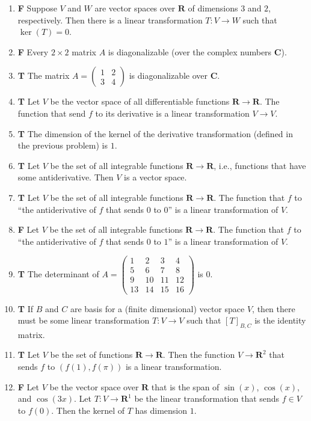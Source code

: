 \documentclass[10pt]{article}
\newcommand{\tf}[2]{\item {\bf {\color{blue}\hspace{1em}#1}}\hspace{1em} #2}
\newcommand{\R}{\mathbf{R}}
\newcommand{\C}{\mathbf{C}}
\begin{document}
\begin{enumerate}
\tf{F}{Suppose $V$ and $W$ are vector spaces over $\R$ of dimensions $3$ and $2$, respectively.
Then there is a linear transformation $T:V\to W$ such that $\ker(T)=0$.}

\tf{F}{Every $2\times 2$ matrix $A$ is diagonalizable (over the complex numbers $\C$).}

\tf{T}{The matrix $A=\left(\begin{array}{rr}
1 & 2 \\
3 & 4
\end{array}\right)$ is diagonalizable over $\C$.}

\tf{T}{Let $V$ be the vector space of all differentiable functions $\R\to \R$.
The function that send $f$ to its derivative is a linear transformation $V\to V$.}

\tf{T}{The dimension of the kernel of the derivative transformation (defined in the previous problem) is $1$.}

\tf{T}{Let $V$ be the set of all integrable functions $\R\to \R$, i.e., functions that
have some antiderivative.  Then $V$ is a vector space.}

\tf{T}{Let $V$ be the set of all integrable functions $\R\to \R$.
The function that $f$ to ``the antiderivative of $f$ that sends
$0$ to $0$'' is a linear transformation of $V$.}

\tf{F}{Let $V$ be the set of all integrable functions $\R\to \R$.
The function that $f$ to ``the antiderivative of $f$ that sends
$0$ to $1$'' is a linear transformation of $V$.}

\tf{T}{The determinant of $A=\left(\begin{array}{rrrr}
1 & 2 & 3 & 4 \\
5 & 6 & 7 & 8 \\
9 & 10 & 11 & 12 \\
13 & 14 & 15 & 16
\end{array}\right)$ is $0$.}

\tf{T}{If $B$ and $C$ are basis for a (finite dimensional) vector space $V$, then there must be some linear transformation
$T:V\to V$ such that $[T]_{B,C}$ is the identity matrix.}

\tf{T}{Let $V$ be the set of functions $\R\to\R$.  Then the function $V\to \R^2$ that sends $f$ to $(f(1), f(\pi))$
is a linear transformation.}

\tf{F}{Let $V$ be the vector space over $\R$ that is the span of $\sin(x)$, $\cos(x)$, and $\cos(3x)$.
Let $T:V\to \R^1$ be the linear transformation that sends $f\in V$ to $f(0)$.
Then the kernel of $T$ has dimension $1$.}


\end{enumerate}
\end{document}
